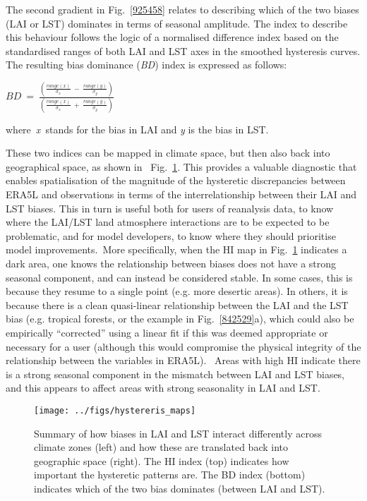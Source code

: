 \documentclass[gmd, manuscript]{copernicus}
\begin{document}
{The second gradient in Fig.~{\ref{925458}} relates to
describing which of the two biases (LAI or LST) dominates in terms of
seasonal amplitude. The index to describe this behaviour follows the
logic of a normalised difference index based on the standardised ranges
of both LAI and LST axes in the smoothed hysteresis curves. The
resulting bias dominance (\emph{BD}) index is expressed as follows:

\(BD\ =\ \frac{\left(\frac{range\left(x\right)}{\sigma_x}\ -\ \frac{range\left(y\right)}{\sigma_y}\right)}{\left(\frac{range\left(x\right)}{\sigma_x}\ +\ \frac{range\left(y\right)}{\sigma_y}\right)}\)

where~\emph{x~}stands for the bias in LAI and \emph{y} is the bias in
LST.

{These two indices can be mapped in climate space, but then also back
into geographical space, as shown in~
Fig.~}{\ref{988186}}{.} This provides a valuable
diagnostic that enables spatialisation of the magnitude of the
hysteretic discrepancies between ERA5L and observations in terms of the
interrelationship between their LAI and LST biases. This in turn is
useful both for users of reanalysis data, to know where the LAI/LST land
atmosphere interactions are to be expected to be problematic, and for
model developers, to know where they should prioritise model
improvements.~{{More specifically, when the HI map in
Fig.~}}{\ref{988186}}{ indicates a dark area, one knows
the relationship between biases does not have a strong seasonal
component}, and can instead be considered stable. In some cases, this is
because they resume to a single point (e.g. more desertic areas). In
others, it is because there is a clean quasi-linear relationship between
the LAI and the LST bias (e.g. tropical forests, or the example in
Fig.~{\ref{842529}}a), which could also be empirically
``corrected'' using a linear fit if this was deemed appropriate or
necessary for a user (although this would compromise the physical
integrity of the relationship between the variables in ERA5L).~ Areas
with high HI indicate there is a strong seasonal component in the
mismatch between LAI and LST biases, and this appears to affect areas
with strong seasonality in LAI and LST.

\par\null{}
\begin{figure}[H]
\begin{center}
\texttt{[image: ../figs/hystereris\_maps]}
\caption{{{Summary of how biases in LAI and LST interact} differently across
climate zones (left) and how these are translated back into geographic
space (right). {The HI index (top) indicates how important the
hysteretic patterns are. The BD index (bottom) indicates which of the
two bias dominates (between LAI and LST).}~
{\label{988186}}%
}}
\end{center}
\end{figure}

}
\end{document}
